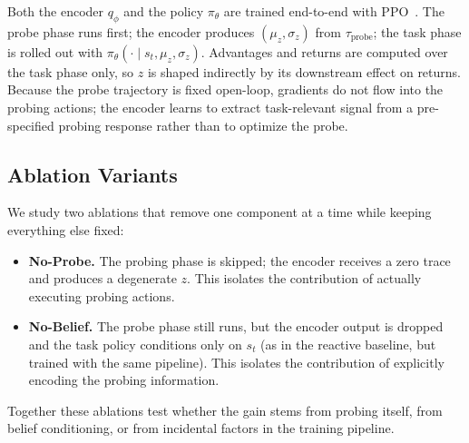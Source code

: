Both the encoder $q_\phi$ and the policy $\pi_\theta$ are trained end-to-end with PPO~\cite{schulman2017proximal}. The probe phase runs first; the encoder produces $(\mu_z, \sigma_z)$ from $\tau_{\mathrm{probe}}$; the task phase is rolled out with $\pi_\theta(\cdot \mid s_t, \mu_z, \sigma_z)$. Advantages and returns are computed over the task phase only, so $z$ is shaped indirectly by its downstream effect on returns. Because the probe trajectory is fixed open-loop, gradients do not flow into the probing actions; the encoder learns to extract task-relevant signal from a pre-specified probing response rather than to optimize the probe.

\subsection{Ablation Variants}

We study two ablations that remove one component at a time while keeping everything else fixed:
\begin{itemize}
    \item \textbf{No-Probe.} The probing phase is skipped; the encoder receives a zero trace and produces a degenerate $z$. This isolates the contribution of actually executing probing actions.
    \item \textbf{No-Belief.} The probe phase still runs, but the encoder output is dropped and the task policy conditions only on $s_t$ (as in the reactive baseline, but trained with the same pipeline). This isolates the contribution of explicitly encoding the probing information.
\end{itemize}
Together these ablations test whether the gain stems from probing itself, from belief conditioning, or from incidental factors in the training pipeline.
